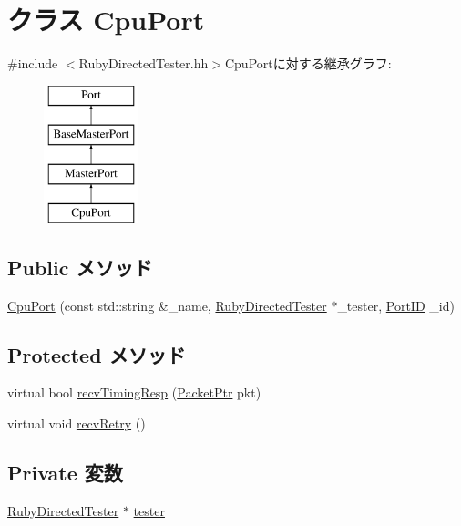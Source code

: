 \hypertarget{classRubyDirectedTester_1_1CpuPort}{
\section{クラス CpuPort}
\label{classRubyDirectedTester_1_1CpuPort}
}


{\ttfamily \#include $<$RubyDirectedTester.hh$>$}CpuPortに対する継承グラフ:\begin{figure}[H]
\begin{center}
\leavevmode
\includegraphics[height=4cm]{classRubyDirectedTester_1_1CpuPort}
\end{center}
\end{figure}
\subsection*{Public メソッド}
\begin{DoxyCompactItemize}
\item 
\hyperlink{classRubyDirectedTester_1_1CpuPort_aefe451fe0d0fe79402ee473f29c82517}{CpuPort} (const std::string \&\_\-name, \hyperlink{classRubyDirectedTester_1_1RubyDirectedTester}{RubyDirectedTester} $\ast$\_\-tester, \hyperlink{base_2types_8hh_acef4d7d41cb21fdc252e20c04cd7bb8e}{PortID} \_\-id)
\end{DoxyCompactItemize}
\subsection*{Protected メソッド}
\begin{DoxyCompactItemize}
\item 
virtual bool \hyperlink{classRubyDirectedTester_1_1CpuPort_a482dba5588f4bee43e498875a61e5e0b}{recvTimingResp} (\hyperlink{classPacket}{PacketPtr} pkt)
\item 
virtual void \hyperlink{classRubyDirectedTester_1_1CpuPort_a7ec461ad187b82b4b21e27c86e45cf9c}{recvRetry} ()
\end{DoxyCompactItemize}
\subsection*{Private 変数}
\begin{DoxyCompactItemize}
\item 
\hyperlink{classRubyDirectedTester_1_1RubyDirectedTester}{RubyDirectedTester} $\ast$ \hyperlink{classRubyDirectedTester_1_1CpuPort_acb5296901e83f3dd66a2fdaab4fbc259}{tester}
\end{DoxyCompactItemize}


